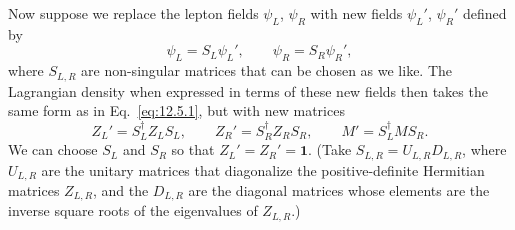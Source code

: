 Now suppose we replace the lepton fields $\psi_L$, $\psi_R$ with new fields
$\psi_L'$, $\psi_R'$ defined by
\begin{equation}
\psi_L=S_L\psi_L',
\qquad
\psi_R=S_R\psi_R',
\tag{12.5.3}\label{eq:12.5.3}
\end{equation}
where $S_{L,R}$ are non-singular matrices that can be chosen as we like. The
Lagrangian density when expressed in terms of these new fields then takes the
same form as in Eq.~\eqref{eq:12.5.1}, but with new matrices
\begin{equation}
Z_L'=S_L^\dagger Z_LS_L,
\qquad
Z_R'=S_R^\dagger Z_RS_R,
\qquad
M'=S_L^\dagger MS_R.
\tag{12.5.4}\label{eq:12.5.4}
\end{equation}
We can choose $S_L$ and $S_R$ so that $Z_L'=Z_R'=\mathbf{1}$. (Take
$S_{L,R}=U_{L,R}D_{L,R}$, where $U_{L,R}$ are the unitary matrices that
diagonalize the positive-definite Hermitian matrices $Z_{L,R}$, and the
$D_{L,R}$ are the diagonal matrices whose elements are the inverse square
roots of the eigenvalues of $Z_{L,R}$.)

